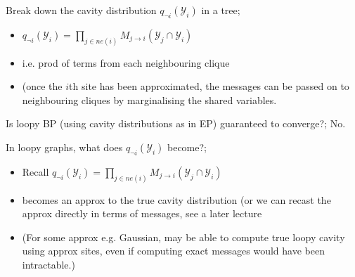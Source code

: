 \documentclass{article}
\begin{document}
Break down the cavity distribution $q_{\neg i}(\mathcal{Y}_i)$ in a tree; \begin{itemize} \item $q_{\neg i}(\mathcal{Y}_i) = \prod_{j\in ne(i)}M_{j\rightarrow i}(\mathcal{Y}_j \cap \mathcal{Y}_i)$ \item i.e. prod of terms from each neighbouring clique \item (once the $i$th site has been approximated, the messages can be passed on to neighbouring cliques by marginalising the shared variables. \end{itemize}

Is loopy BP (using cavity distributions as in EP) guaranteed to converge?; No.

In loopy graphs, what does $q_{\neg i}(\mathcal{Y}_i)$ become?; \begin{itemize} \item Recall $q_{\neg i}(\mathcal{Y}_i) = \prod_{j\in ne(i)}M_{j\rightarrow i}(\mathcal{Y}_j \cap \mathcal{Y}_i)$ \item becomes an approx to the true cavity distribution (or we can recast the approx directly in terms of messages, see a later lecture \item (For some approx e.g. Gaussian, may be able to compute true loopy cavity using approx sites, even if computing exact messages would have been intractable.) \end{itemize} 

\end{document}
